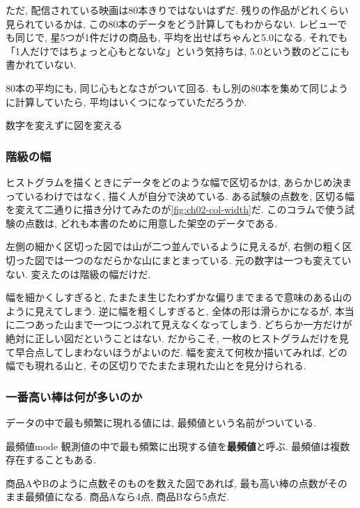     ただ, 配信されている映画は80本きりではないはずだ.
    残りの作品がどれくらい見られているかは, この80本のデータをどう計算してもわからない.
    レビューでも同じで, 星5つが1件だけの商品も, 平均を出せばちゃんと5.0になる.
    それでも「1人だけではちょっと心もとないな」という気持ちは, 5.0という数のどこにも書かれていない.

    80本の平均にも, 同じ心もとなさがついて回る.
    もし別の80本を集めて同じように計算していたら, 平均はいくつになっていただろうか.

\begin{mybox}{数字を変えずに図を変える}

  \subsubsection*{階級の幅}

    ヒストグラムを描くときにデータをどのような幅で区切るかは, あらかじめ決まっているわけではなく, 描く人が自分で決めている.
    ある試験の点数を, 区切る幅を変えて二通りに描き分けてみたのが\cref{fig:ch02-col-width}だ.
    このコラムで使う試験の点数は, どれも本書のために用意した架空のデータである.

    左側の細かく区切った図では山が二つ並んでいるように見えるが, 右側の粗く区切った図では一つのなだらかな山にまとまっている.
    元の数字は一つも変えていない. 変えたのは階級の幅だけだ.

    幅を細かくしすぎると, たまたま生じたわずかな偏りまでまるで意味のある山のように見えてしまう.
    逆に幅を粗くしすぎると, 全体の形は滑らかになるが, 本当に二つあった山まで一つにつぶれて見えなくなってしまう.
    どちらか一方だけが絶対に正しい図だということはない.
    だからこそ, 一枚のヒストグラムだけを見て早合点してしまわないほうがよいのだ.
    幅を変えて何枚か描いてみれば, どの幅でも現れる山と, その区切りでたまたま現れた山とを見分けられる.

  \subsubsection*{一番高い棒は何が多いのか}

    データの中で最も頻繁に現れる値には, 最頻値という名前がついている.

    \begin{defi}[unbreakable]{最頻値}{mode}
      観測値の中で最も頻繁に出現する値を\textbf{最頻値}と呼ぶ.
      最頻値は複数存在することもある.
    \end{defi}

    商品AやBのように点数そのものを数えた図であれば, 最も高い棒の点数がそのまま最頻値になる.
    商品Aなら4点, 商品Bなら5点だ.


\end{mybox}
